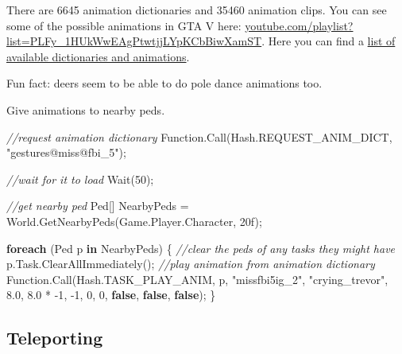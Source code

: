 \documentclass[
  openany]{book}
\newenvironment{Shaded}{\begin{snugshade}}{\end{snugshade}}
\newcommand{\CommentTok}[1]{\textcolor[rgb]{0.56,0.35,0.01}{\textit{#1}}}
\newcommand{\DecValTok}[1]{\textcolor[rgb]{0.00,0.00,0.81}{#1}}
\newcommand{\FloatTok}[1]{\textcolor[rgb]{0.00,0.00,0.81}{#1}}
\newcommand{\FunctionTok}[1]{\textcolor[rgb]{0.00,0.00,0.00}{#1}}
\newcommand{\KeywordTok}[1]{\textcolor[rgb]{0.13,0.29,0.53}{\textbf{#1}}}
\newcommand{\NormalTok}[1]{#1}
\newcommand{\StringTok}[1]{\textcolor[rgb]{0.31,0.60,0.02}{#1}}
\begin{document}
There are 6645 animation dictionaries and 35460 animation clips. You can see some of the possible animations in GTA V here: \href{https://www.youtube.com/playlist?list=PLFy_1HUkWwEAgPtwtjjLYpKCbBiwXamST}{youtube.com/playlist?list=PLFy\_1HUkWwEAgPtwtjjLYpKCbBiwXamST}.
Here you can find a \href{https://docs.ragepluginhook.net/html/62951c37-a440-478c-b389-c471230ddfc5.htm}{list of available dictionaries and animations}.

Fun fact: deers seem to be able to do pole dance animations too.

Give animations to nearby peds.

\begin{Shaded}
\begin{Highlighting}[]
\CommentTok{//request animation dictionary}
\NormalTok{Function.}\FunctionTok{Call}\NormalTok{(Hash.}\FunctionTok{REQUEST_ANIM_DICT}\NormalTok{, }\StringTok{"gestures@miss@fbi_5"}\NormalTok{);}

\CommentTok{//wait for it to load}
\FunctionTok{Wait}\NormalTok{(}\DecValTok{50}\NormalTok{);}

\CommentTok{//get nearby ped}
\NormalTok{Ped[] NearbyPeds = World.}\FunctionTok{GetNearbyPeds}\NormalTok{(Game.}\FunctionTok{Player}\NormalTok{.}\FunctionTok{Character}\NormalTok{, 20f);}

\KeywordTok{foreach}\NormalTok{ (Ped p }\KeywordTok{in}\NormalTok{ NearbyPeds)}
\NormalTok{\{   }
    \CommentTok{//clear the peds of any tasks they might have}
\NormalTok{    p.}\FunctionTok{Task}\NormalTok{.}\FunctionTok{ClearAllImmediately}\NormalTok{();}
    \CommentTok{//play animation from animation dictionary}
\NormalTok{    Function.}\FunctionTok{Call}\NormalTok{(Hash.}\FunctionTok{TASK_PLAY_ANIM}\NormalTok{, p, }\StringTok{"missfbi5ig_2"}\NormalTok{, }\StringTok{"crying_trevor"}\NormalTok{, }\FloatTok{8.0}\NormalTok{, }\FloatTok{8.0}\NormalTok{ * }\DecValTok{-1}\NormalTok{, }\DecValTok{-1}\NormalTok{, }\DecValTok{0}\NormalTok{, }\DecValTok{0}\NormalTok{, }\KeywordTok{false}\NormalTok{, }\KeywordTok{false}\NormalTok{, }\KeywordTok{false}\NormalTok{);}
\NormalTok{\}}
\end{Highlighting}
\end{Shaded}

\hypertarget{teleporting}{%
\subsection*{Teleporting}\label{teleporting}}
\end{document}
